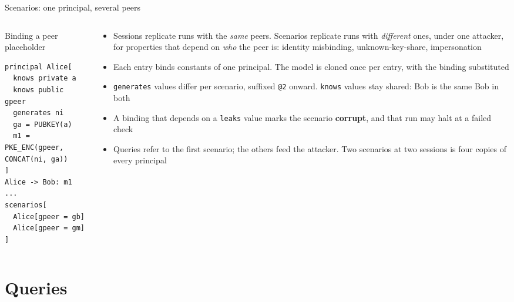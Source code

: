 \ifdefined\PRESENTATION\else\PassOptionsToClass{handout}{beamer}\fi\documentclass[aspectratio=169, lualatex]{beamer}
\begin{document}
\begin{frame}[fragile]{Scenarios: one principal, several peers}
	\begin{columns}[t]
		\begin{column}{0.44\textwidth}
			\begin{vpmodel}{Binding a peer placeholder}
				\begin{lstlisting}
principal Alice[
  knows private a
  knows public gpeer
  generates ni
  ga = PUBKEY(a)
  m1 = PKE_ENC(gpeer, CONCAT(ni, ga))
]
Alice -> Bob: m1
...
scenarios[
  Alice[gpeer = gb]
  Alice[gpeer = gm]
]
\end{lstlisting}
			\end{vpmodel}
		\end{column}
		\begin{column}{0.54\textwidth}
			\scriptsize
			\begin{itemize}
				\item Sessions replicate runs with the \textit{same} peers. Scenarios replicate runs with \textit{different} ones, under one attacker, for properties that depend on \textit{who} the peer is: identity misbinding, unknown-key-share, impersonation
				\item Each entry binds constants of one principal. The model is cloned once per entry, with the binding substituted
				\item \texttt{generates} values differ per scenario, suffixed \texttt{@2} onward. \texttt{knows} values stay shared: Bob is the same Bob in both
				\item A binding that depends on a \texttt{leaks} value marks the scenario \textbf{corrupt}, and that run may halt at a failed check
				\item Queries refer to the first scenario; the others feed the attacker. Two scenarios at two sessions is four copies of every principal
			\end{itemize}
		\end{column}
	\end{columns}
\end{frame}

\section{Queries}
\end{document}
